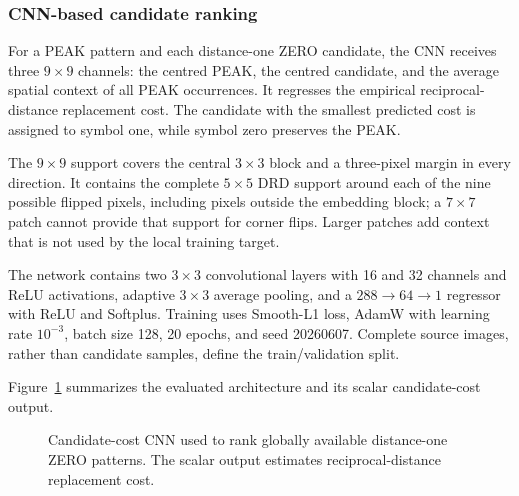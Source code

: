 \documentclass[a4paper,fleqn]{cas-dc}
\begin{document}
\subsubsection*{CNN-based candidate ranking}

For a PEAK pattern and each distance-one ZERO candidate, the CNN receives three
$9\times9$ channels: the centred PEAK, the centred candidate, and the average
spatial context of all PEAK occurrences. It regresses the empirical
reciprocal-distance replacement cost. The candidate with the smallest predicted
cost is assigned to symbol one, while symbol zero preserves the PEAK.

The $9\times9$ support covers the central $3\times3$ block and a three-pixel
margin in every direction. It contains the complete $5\times5$ DRD support
around each of the nine possible flipped pixels, including pixels outside the
embedding block; a $7\times7$ patch cannot provide that support for corner
flips. Larger patches add context that is not used by the local training
target.

The network contains two $3\times3$ convolutional layers with 16 and 32
channels and ReLU activations, adaptive $3\times3$ average pooling, and a
$288\rightarrow64\rightarrow1$ regressor with ReLU and Softplus. Training uses
Smooth-L1 loss, AdamW with learning rate $10^{-3}$, batch size 128, 20 epochs,
and seed 20260607. Complete source images, rather than candidate samples, define
the train/validation split.

Figure~\ref{fig:cnn-architecture} summarizes the evaluated architecture and
its scalar candidate-cost output.

\begin{figure}[t]
\centering
{}
\caption{Candidate-cost CNN used to rank globally available distance-one ZERO
patterns. The scalar output estimates reciprocal-distance replacement cost.}
\label{fig:cnn-architecture}
\end{figure}
\end{document}

